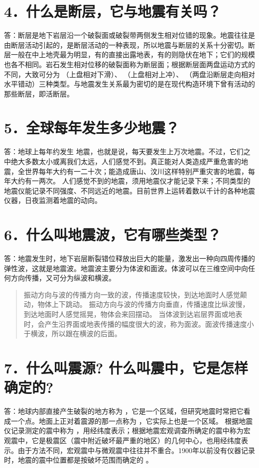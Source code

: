 \documentclass[a4paper,10pt,english]{sphinxmanual}
\begin{document}
\section{4．什么是断层，它与地震有关吗？}
\label{\detokenize{index:id6}}
答：断层是地下岩层沿一个破裂面或破裂带两侧发生相对位错的现象。地震往往是由断层活动引起的，是断层活动的一种表现，所以地震与断层的关系十分密切。断层一般在中上地壳最为明显，有的直接出露地表，有的则隐伏在地下；它们的规模也各不相同。岩石发生相对位移的破裂面称为断层面；根据断层面两盘运动方式的不同，大致可分为  （上盘相对下滑）、 （上盘相对上冲）、 （两盘沿断层走向相对水平错动）三种类型。与地震发生关系最为密切的是在现代构造环境下曾有活动的那些断层，即活断层。


\section{5．全球每年发生多少地震？}
\label{\detokenize{index:id7}}
答：地球上每年约发生   地震，也就是说，每天要发生上万次地震。不过，它们之中绝大多数太小或离我们太远，人们感觉不到。真正能对人类造成严重危害的地震，全世界每年大约有一二十次；能造成唐山、汶川这样特别严重灾害的地震，每年大约有一两次。
人们感觉不到的地震，须用地震仪才能记录下来；不同类型的地震仪能记录不同强度、不同远近的地震。目前世界上运转着数以千计的各种地震仪器，日夜监测着地震的动向。


\section{6．什么叫地震波，它有哪些类型？}
\label{\detokenize{index:id8}}
答：地震发生时，地下岩层断裂错位释放出巨大的能量，激发出一种向四周传播的弹性波，这就是地震波。地震波主要分为体波和面波。体波可以在三维空间中向任何方向传播，又可分为纵波和横波。
\begin{quote}

 振动方向与波的传播方向一致的波，传播速度较快，到达地面时人感觉颠动，物体上下跳动。
 振动方向与波的传播方向垂直，传播速度比纵波慢，到达地面时人感觉摇晃，物体会来回摆动。
 当体波到达岩层界面或地表时，会产生沿界面或地表传播的幅度很大的波，称为面波。面波传播速度小于横波，所以跟在横波的后面。
\end{quote}


\section{7．什么叫震源? 什么叫震中，它是怎样确定的?}
\label{\detokenize{index:id9}}
答：地球内部直接产生破裂的地方称为  ，它是一个区域，但研究地震时常把它看成一个点。地面上正对着震源的那一点称为  ，它实际上也是一个区域。
根据地震仪记录测定的震中称为  ，用经纬度表示；根据地震宏观调查所确定的震中称为宏观震中，它是极震区（震中附近破坏最严重的地区）的几何中心，也用经纬度表示。由于方法不同，宏观震中与微观震中往往并不重合。1900年以前没有仪器记录时，地震的震中位置都是按破坏范围而确定的  。
\end{document}
